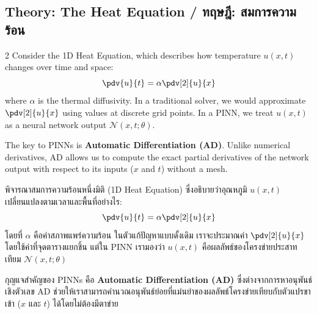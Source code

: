 \subsection{Theory: The Heat Equation \quad / \quad \textthai{ทฤษฎี: สมการความร้อน}}
\begin{paracol}{2}
Consider the 1D Heat Equation, which describes how temperature $u(x, t)$ changes over time and space:
\begin{equation}
    \pdv{u}{t} = \alpha \pdv[2]{u}{x}
\end{equation}
where $\alpha$ is the thermal diffusivity. In a traditional solver, we would approximate $\pdv[2]{u}{x}$ using values at discrete grid points. In a PINN, we treat $u(x, t)$ as a neural network output $\mathcal{N}(x, t; \theta)$.

The key to PINNs is \textbf{Automatic Differentiation (AD)}. Unlike numerical derivatives, AD allows us to compute the exact partial derivatives of the network output with respect to its inputs ($x$ and $t$) without a mesh.

\switchcolumn

\begin{thai}
พิจารณาสมการความร้อนหนึ่งมิติ (1D Heat Equation) ซึ่งอธิบายว่าอุณหภูมิ $u(x, t)$ เปลี่ยนแปลงตามเวลาและพื้นที่อย่างไร:
\begin{equation}
    \pdv{u}{t} = \alpha \pdv[2]{u}{x}
\end{equation}
โดยที่ $\alpha$ คือค่าสภาพแพร่ความร้อน ในตัวแก้ปัญหาแบบดั้งเดิม เราจะประมาณค่า $\pdv[2]{u}{x}$ โดยใช้ค่าที่จุดตารางแยกชิ้น แต่ใน PINN เรามองว่า $u(x, t)$ คือผลลัพธ์ของโครงข่ายประสาทเทียม $\mathcal{N}(x, t; \theta)$

กุญแจสำคัญของ PINNs คือ \textbf{Automatic Differentiation (AD)} ซึ่งต่างจากการหาอนุพันธ์เชิงตัวเลข AD ช่วยให้เราสามารถคำนวณอนุพันธ์ย่อยที่แม่นยำของผลลัพธ์โครงข่ายเทียบกับตัวแปรขาเข้า ($x$ และ $t$) ได้โดยไม่ต้องมีตาข่าย
\end{thai}
\end{paracol}
